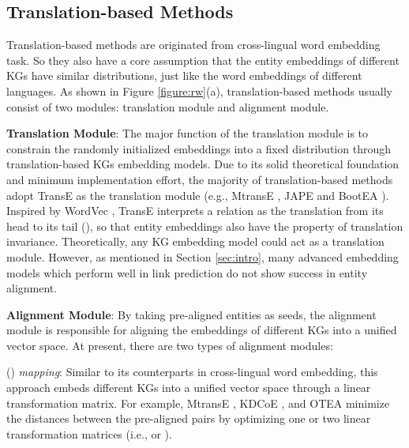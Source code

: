 \documentclass[sigconf,camera-ready]{acmart}
\begin{document}
\subsection{Translation-based Methods}
Translation-based methods are originated from cross-lingual word embedding task.
So they also have a core assumption that the entity embeddings of different KGs have similar distributions, just like the word embeddings of different languages.
As shown in Figure \ref{figure:rw}(a), translation-based methods usually consist of two modules: translation module and alignment module.

\textbf{Translation Module}:
The major function of the translation module is to constrain the randomly initialized embeddings into a fixed distribution through translation-based KGs embedding models.
Due to its solid theoretical foundation and minimum implementation effort, the majority of translation-based methods adopt TransE \cite{DBLP:conf/nips/BordesUGWY13} as the translation module (e.g., MtransE \cite{DBLP:conf/ijcai/ChenTYZ17}, JAPE \cite{DBLP:conf/semweb/SunHL17} and BootEA \cite{DBLP:conf/ijcai/SunHZQ18}).
Inspired by WordVec \cite{DBLP:journals/corr/MikolovLS13}, TransE interprets a relation as the translation from its head to its tail (), so that entity embeddings also have the property of translation invariance.
Theoretically, any KG embedding model could act as a translation module.
However, as mentioned in Section \ref{sec:intro}, many advanced embedding models \cite{DBLP:conf/aaai/DettmersMS018,DBLP:conf/aaai/LinLSLZ15} which perform well in link prediction do not show success in entity alignment.

\textbf{Alignment Module}:
By taking pre-aligned entities as seeds, the alignment module is responsible for aligning the embeddings of different KGs into a unified vector space.
At present, there are two types of alignment modules:

() \emph{mapping}:
Similar to its counterparts in cross-lingual word embedding, this approach embeds different KGs into a unified vector space through a linear transformation matrix.
For example, MtransE \cite{DBLP:conf/ijcai/ChenTYZ17}, KDCoE \cite{DBLP:conf/ijcai/ChenTCSZ18}, and OTEA \cite{DBLP:conf/ijcai/Pei0Z19} minimize the distances between the pre-aligned pairs by optimizing one or two linear transformation matrices (i.e.,  or ).
\end{document}
